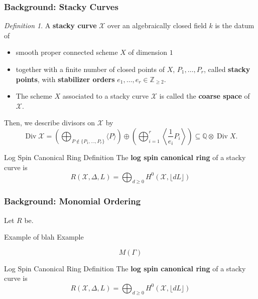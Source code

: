 \documentclass{beamer}
\theoremstyle{remark}
\newtheorem{defn}[thm]{Definition}
\newcommand\BQ{{\mathbb Q}}
\newcommand\BZ{{\mathbb Z}}
\newcommand \sx{{\mathscr X}}
\DeclareMathOperator\di{Div}
\newcommand{\halfcan}{L}
\begin{document}
\begin{frame}
\frametitle{Background: Stacky Curves}
\begin{defn}
A \textbf{stacky curve} $\sx$ over an algebraically closed field $k$ is the datum of 
\begin{itemize}
\item smooth proper connected scheme $X$ of dimension $1$ \\ 
\item together with a finite number of closed points of $X$, $P_1, \ldots, P_r$, called {\bf stacky points}, with {\bf stabilizer orders} $e_1, \ldots, e_r \in \BZ_{\geq 2}.$ \\ 
\item The scheme $X$ associated to a stacky curve $\sx$ is called the {\bf coarse space} of $\sx$.
\end{itemize}
\end{defn}

\pause

Then, we describe divisors on $\sx$ by
\[
	\di \sx = \left(\bigoplus_{P\notin \{P_1, \ldots, P_r\}} \langle 
	P \rangle \right) \oplus \left(\bigoplus_{i = 1}^r \left \langle 
	\frac{1}{e_i}P_i \right \rangle \right) \subseteq \BQ \otimes \di X.
\]


\pause
\begin{alertblock}{Log Spin Canonical Ring Definition}
The \textbf{log spin canonical ring} of a stacky curve is
\[
	R(\sx, \Delta, \halfcan) = \bigoplus_{d \geq 0} H^0(\sx, \lfloor d \halfcan \rfloor)
\]
\end{alertblock}

\end{frame}


\begin{frame}
\frametitle{Background: Monomial Ordering}
Let $R$ be.

\pause
\begin{exampleblock}{Example of blah}
Example
\end{exampleblock}

\pause
\[
   M(\Gamma)
\]

\pause
\begin{alertblock}{Log Spin Canonical Ring Definition}
The \textbf{log spin canonical ring} of a stacky curve is
\[
	R(\sx, \Delta, \halfcan) = \bigoplus_{d \geq 0} H^0(\sx, \lfloor d \halfcan \rfloor)
\]
\end{alertblock}

\end{frame}
\end{document}
